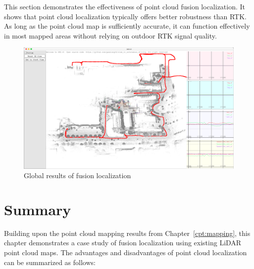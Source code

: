 This section demonstrates the effectiveness of point cloud fusion localization. It shows that point cloud localization typically offers better robustness than RTK. As long as the point cloud map is sufficiently accurate, it can function effectively in most mapped areas without relying on outdoor RTK signal quality.

\begin{figure}[!t]
	\centering
	\includegraphics[width=1.0\textwidth]{resources/localization/fusion-full.png}
	\caption{Global results of fusion localization}
	\label{fig:fusion-loc}
\end{figure}

\section{Summary}
Building upon the point cloud mapping results from Chapter~\ref{cpt:mapping}, this chapter demonstrates a case study of fusion localization using existing LiDAR point cloud maps. The advantages and disadvantages of point cloud localization can be summarized as follows:

